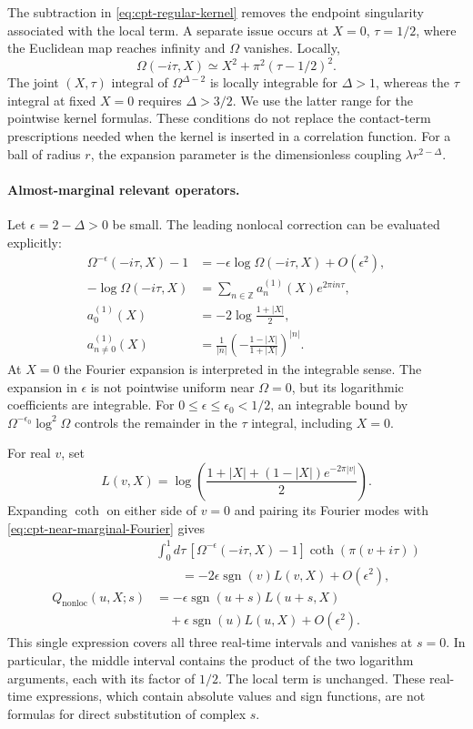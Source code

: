 \documentclass[a4paper,11pt]{article}
\theoremstyle{definition}
\begin{document}
The subtraction in \eqref{eq:cpt-regular-kernel} removes the endpoint singularity associated with the local term. A separate issue occurs at $X=0$, $\tau=1/2$, where the Euclidean map reaches infinity and $\Omega$ vanishes. Locally,
\[
 \Omega(-i\tau,X)\simeq X^2+\pi^2(\tau-1/2)^2.
\]
The joint $(X,\tau)$ integral of $\Omega^{\Delta-2}$ is locally integrable for $\Delta>1$, whereas the $\tau$ integral at fixed $X=0$ requires $\Delta>3/2$. We use the latter range for the pointwise kernel formulas. These conditions do not replace the contact-term prescriptions needed when the kernel is inserted in a correlation function. For a ball of radius $r$, the expansion parameter is the dimensionless coupling $\lambda r^{2-\Delta}$.

\paragraph{Almost-marginal relevant operators.}
Let $\epsilon=2-\Delta>0$ be small. The leading nonlocal correction can be evaluated explicitly:
\begin{align}
 \Omega^{-\epsilon}(-i\tau,X)-1
 &=-\epsilon\log\Omega(-i\tau,X)+O(\epsilon^2),\nonumber\\
 -\log\Omega(-i\tau,X)&=\sum_{n\in\mathbb Z}a_n^{(1)}(X)e^{2\pi in\tau},\nonumber\\
 a_0^{(1)}(X)&=-2\log\frac{1+|X|}{2},\nonumber\\
 a_{n\ne0}^{(1)}(X)&=\frac1{|n|}
 \left(-\frac{1-|X|}{1+|X|}\right)^{|n|}.
 \label{eq:cpt-near-marginal-Fourier}
\end{align}
At $X=0$ the Fourier expansion is interpreted in the integrable sense. The expansion in $\epsilon$ is not pointwise uniform near $\Omega=0$, but its logarithmic coefficients are integrable. For $0\leq\epsilon\leq\epsilon_0<1/2$, an integrable bound by $\Omega^{-\epsilon_0}\log^2\Omega$ controls the remainder in the $\tau$ integral, including $X=0$.

For real $v$, set
\begin{equation}
 L(v,X)=\log\left(\frac{1+|X|+(1-|X|)e^{-2\pi|v|}}{2}\right).
\end{equation}
Expanding $\coth$ on either side of $v=0$ and pairing its Fourier modes with \eqref{eq:cpt-near-marginal-Fourier} gives
\begin{align}
 &\int_0^1d\tau\,[\Omega^{-\epsilon}(-i\tau,X)-1]
 \coth(\pi(v+i\tau))\nonumber\\
 &\qquad=-2\epsilon\operatorname{sgn}(v)L(v,X)+O(\epsilon^2),\nonumber\\
 Q_{\mathrm{nonloc}}(u,X;s)
 &=-\epsilon\operatorname{sgn}(u+s)L(u+s,X)\nonumber\\
 &\quad+\epsilon\operatorname{sgn}(u)L(u,X)+O(\epsilon^2).
 \label{eq:cpt-near-marginal-Q}
\end{align}
This single expression covers all three real-time intervals and vanishes at $s=0$. In particular, the middle interval contains the product of the two logarithm arguments, each with its factor of $1/2$. The local term is unchanged. These real-time expressions, which contain absolute values and sign functions, are not formulas for direct substitution of complex $s$.
\end{document}
